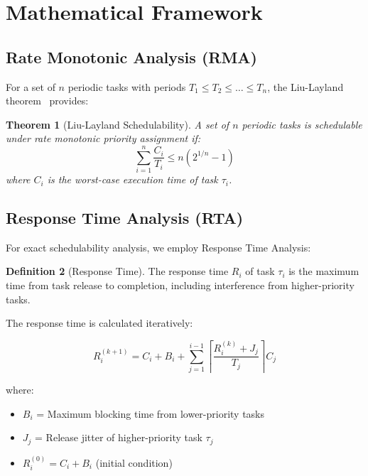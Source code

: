 \documentclass[11pt,a4paper]{article}
\newtheorem{theorem}{Theorem}[section]
\theoremstyle{definition}
\newtheorem{definition}[theorem]{Definition}
\theoremstyle{remark}
\begin{document}
\section{Mathematical Framework}

\subsection{Rate Monotonic Analysis (RMA)}

For a set of $n$ periodic tasks with periods $T_1 \leq T_2 \leq \ldots \leq T_n$, the Liu-Layland theorem~\cite{liu1973} provides:

\begin{theorem}[Liu-Layland Schedulability]
A set of $n$ periodic tasks is schedulable under rate monotonic priority assignment if:
\begin{equation}
\sum_{i=1}^{n} \frac{C_i}{T_i} \leq n(2^{1/n} - 1)
\end{equation}
where $C_i$ is the worst-case execution time of task $\tau_i$.
\end{theorem}

\subsection{Response Time Analysis (RTA)}

For exact schedulability analysis, we employ Response Time Analysis:

\begin{definition}[Response Time]
The response time $R_i$ of task $\tau_i$ is the maximum time from task release to completion, including interference from higher-priority tasks.
\end{definition}

The response time is calculated iteratively:

\begin{equation}
R_i^{(k+1)} = C_i + B_i + \sum_{j=1}^{i-1} \left\lceil \frac{R_i^{(k)} + J_j}{T_j} \right\rceil C_j
\end{equation}

where:
\begin{itemize}
\item $B_i$ = Maximum blocking time from lower-priority tasks
\item $J_j$ = Release jitter of higher-priority task $\tau_j$
\item $R_i^{(0)} = C_i + B_i$ (initial condition)
\end{itemize}
\end{document}
